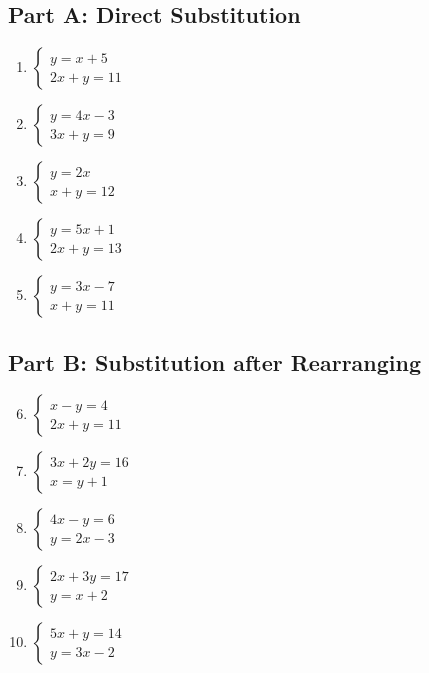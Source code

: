 \documentclass[14pt]{extarticle}
\begin{document}
\subsection*{Part A: Direct Substitution}
\begin{enumerate}
    \item \(\begin{cases} y = x + 5 \\ 2x + y = 11 \end{cases}\)
    \item \(\begin{cases} y = 4x - 3 \\ 3x + y = 9 \end{cases}\)
    \item \(\begin{cases} y = 2x \\ x + y = 12 \end{cases}\)
    \item \(\begin{cases} y = 5x + 1 \\ 2x + y = 13 \end{cases}\)
    \item \(\begin{cases} y = 3x - 7 \\ x + y = 11 \end{cases}\)
\end{enumerate}

\subsection*{Part B: Substitution after Rearranging}
\begin{enumerate}
    \setcounter{enumi}{5}
    \item \(\begin{cases} x - y = 4 \\ 2x + y = 11 \end{cases}\)
    \item \(\begin{cases} 3x + 2y = 16 \\ x = y + 1 \end{cases}\)
    \item \(\begin{cases} 4x - y = 6 \\ y = 2x - 3 \end{cases}\)
    \item \(\begin{cases} 2x + 3y = 17 \\ y = x + 2 \end{cases}\)
    \item \(\begin{cases} 5x + y = 14 \\ y = 3x - 2 \end{cases}\)
\end{enumerate}
\end{document}

